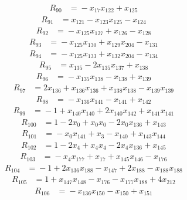 \begin{align*}
R_{90}&={}-x_{17}x_{122} +x_{125}
\end{align*}
\begin{align*}
R_{91}&={}x_{121} -x_{123}x_{125} -x_{124}
\end{align*}
\begin{align*}
R_{92}&={}-x_{125}x_{127} +x_{126} -x_{128}
\end{align*}
\begin{align*}
R_{93}&={}-x_{125}x_{130} +x_{129}x_{204} -x_{131}
\end{align*}
\begin{align*}
R_{94}&={}-x_{125}x_{133} +x_{132}x_{204} -x_{134}
\end{align*}
\begin{align*}
R_{95}&={}x_{135} -2x_{135}x_{137} +x_{138}
\end{align*}
\begin{align*}
R_{96}&={}-x_{135}x_{138} -x_{138} +x_{139}
\end{align*}
\begin{align*}
R_{97}&={}2x_{136} +x_{136}x_{136} +x_{138}x_{138} -x_{139}x_{139}
\end{align*}
\begin{align*}
R_{98}&={}-x_{136}x_{141} -x_{141} +x_{142}
\end{align*}
\begin{align*}
R_{99}&={}-1 +x_{140}x_{140} +2x_{140}x_{142} +x_{141}x_{141}
\end{align*}
\begin{align*}
R_{100}&={}1 -2x_{0} +x_{0}x_{0} -2x_{0}x_{136} +x_{143}
\end{align*}
\begin{align*}
R_{101}&={}-x_{0}x_{141} +x_{3} -x_{140} +x_{143}x_{144}
\end{align*}
\begin{align*}
R_{102}&={}1 -2x_{4} +x_{4}x_{4} -2x_{4}x_{136} +x_{145}
\end{align*}
\begin{align*}
R_{103}&={}-x_{4}x_{177} +x_{17} +x_{145}x_{146} -x_{176}
\end{align*}
\begin{align*}
R_{104}&={}-1 +2x_{136}x_{188} -x_{147} +2x_{188} -x_{188}x_{188}
\end{align*}
\begin{align*}
R_{105}&={}1 +x_{147}x_{148} -x_{176} -x_{177}x_{188} +4x_{212}
\end{align*}
\begin{align*}
R_{106}&={}-x_{136}x_{150} -x_{150} +x_{151}
\end{align*}
